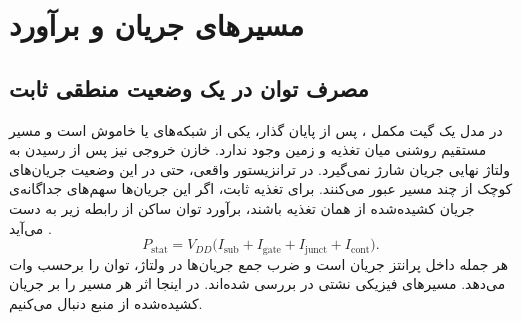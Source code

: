 \section{مسیرهای جریان و برآورد }
\label{sec:power-static}

\subsection{مصرف توان در یک وضعیت منطقی ثابت}
\label{sec:power-static-sources}

در مدل  یک گیت مکمل ، پس از پایان گذار، یکی
از شبکه‌های  یا  خاموش است و مسیر مستقیم
روشنی میان تغذیه و زمین وجود ندارد. خازن خروجی نیز پس از رسیدن به
ولتاژ نهایی جریان شارژ نمی‌گیرد. در ترانزیستور واقعی، حتی در این وضعیت
جریان‌های کوچک از چند مسیر عبور می‌کنند. برای تغذیه ثابت، اگر این
جریان‌ها سهم‌های جداگانه‌ی جریان کشیده‌شده از همان تغذیه باشند، برآورد
توان ساکن از رابطه زیر به دست می‌آید
\cite[رابطه  و بخش ،
صفحات ۱۸۵ و ۱۹۴ تا ۱۹۷]{weste}\cite[اسلایدهای ۱۰ و ۲۰]{powerslides}.
\begin{equation}
  P_{\mathrm{stat}}
    =V_{DD}\bigl(I_{\mathrm{sub}}+I_{\mathrm{gate}}+
                 I_{\mathrm{junct}}+I_{\mathrm{cont}}
           \bigr).
  \label{eq:power-static}
\end{equation}
هر جمله داخل پرانتز جریان است و ضرب جمع جریان‌ها در ولتاژ، توان
را برحسب وات می‌دهد. مسیرهای فیزیکی نشتی در
 بررسی شده‌اند. در اینجا
اثر هر مسیر را بر جریان کشیده‌شده از منبع دنبال می‌کنیم.

